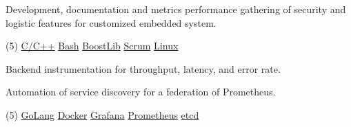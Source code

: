 \documentclass[10pt,a4paper]{altacv}
\begin{document}
{\smallskip\justifying
{\faAngleRight} {\color{description}
Development, documentation and metrics performance gathering of security and logistic features for customized embedded system.
\par}
\smallskip


\vspace{-0.5mm}
\begin{tasks}[label-offset=0.5mm, item-indent=5.0mm, label-align=left, label={\scriptsize\faCode}, label-format={\scriptsize\color{tech}}, item-format={\bfseries\footnotesize\color{emphasis}}](5)
	\task \href{https://www.cplusplus.com/}{C/C++}
	\task \href{https://www.gnu.org/software/bash/}{Bash}
	\task \href{https://www.boost.org/}{BoostLib}
	\task \href{http://www.scrummanifesto.org/}{Scrum}
	\task \href{https://www.archlinux.org/}{Linux}
\end{tasks}

\divider


{\smallskip\justifying
{\faAngleRight} {\color{description}Backend instrumentation for throughput, latency, and error rate.}
\par}
\smallskip

{\smallskip\justifying
{\faAngleRight} {\color{description}Automation of service discovery for a federation of Prometheus.}
\par}

\vspace{-0.5mm}
\begin{tasks}[label-offset=0.5mm, item-indent=5.0mm, label-align=left, label={\scriptsize\faCode}, label-format={\scriptsize\color{tech}}, item-format={\bfseries\footnotesize\color{emphasis}}](5)
	\task \href{https://golang.org/}{GoLang}
	\task \href{https://www.docker.com/}{Docker}
	\task \href{https://grafana.com/}{Grafana}
	\task \href{https://prometheus.io/}{Prometheus}
	\task \href{https://etcd.io/}{etcd}
\end{tasks}

\divider



}
\end{document}
